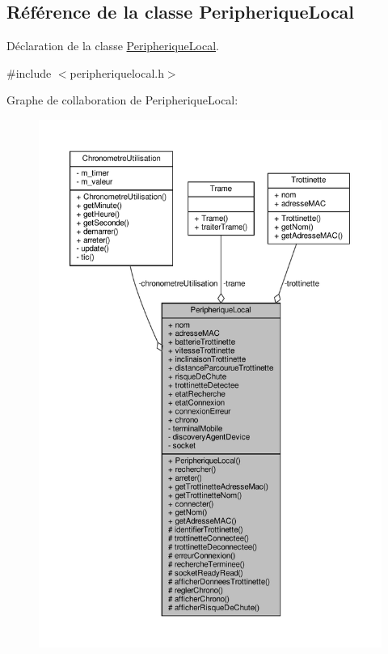 \hypertarget{class_peripherique_local}{}\subsection{Référence de la classe Peripherique\+Local}
\label{class_peripherique_local}


Déclaration de la classe \hyperlink{class_peripherique_local}{Peripherique\+Local}.  




{\ttfamily \#include $<$peripheriquelocal.\+h$>$}



Graphe de collaboration de Peripherique\+Local\+:
\nopagebreak
\begin{figure}[H]
\begin{center}
\leavevmode
\includegraphics[width=350pt]{class_peripherique_local__coll__graph}
\end{center}
\end{figure}

